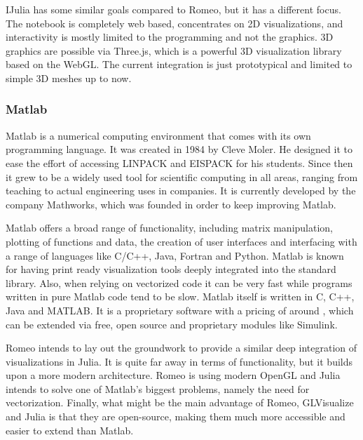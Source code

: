 IJulia has some similar goals compared to Romeo, but it has a different focus.
The notebook is completely web based, concentrates on 2D visualizations, and interactivity is mostly limited to the programming and not the graphics.
3D graphics are possible via Three.js, which is a powerful 3D visualization library based on the \ac{WebGL}.
The current integration is just prototypical and limited to simple 3D meshes up to now\cite{Meshes}\cite{Compose3D}.


\subsubsection{Matlab}

\ac{Matlab} is a numerical computing environment that comes with its own programming language.
It was created in 1984 by Cleve Moler. He designed it to ease the effort of accessing LINPACK and EISPACK for his students.
Since then it grew to be a widely used tool for scientific computing in all areas, ranging from teaching to actual engineering uses in companies. It is currently developed by the company Mathworks, which was founded in order to keep improving Matlab.

Matlab offers a broad range of functionality, including matrix manipulation, plotting of functions and data, the creation of user interfaces and interfacing with a range of languages like C/C++, Java, Fortran and Python. 
Matlab is known for having print ready visualization tools deeply integrated into the standard library.
Also, when relying on vectorized code it can be very fast while programs written in pure Matlab code tend to be slow.
\ac{Matlab} itself is written in C, C++, Java and MATLAB.
It is a proprietary software with a pricing of around \cite{MatlabPricing}, which can be extended via free, open source and proprietary modules like Simulink.

Romeo intends to lay out the groundwork to provide a similar deep integration of visualizations in Julia. 
It is quite far away in terms of functionality, but it builds upon a more modern architecture.
Romeo is using modern OpenGL and Julia intends to solve one of Matlab's biggest problems, namely the need for vectorization.
Finally, what might be the main advantage of Romeo, GLVisualize and Julia is that they are open-source, making them much more accessible and easier to extend than Matlab.


